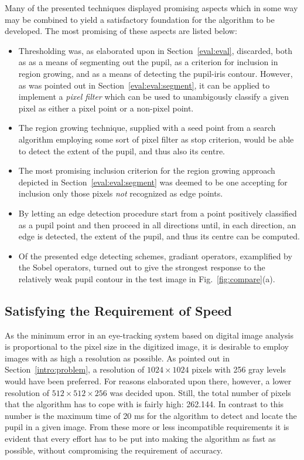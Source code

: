 Many of the presented techniques displayed promising aspects which in
some way may be combined to yield a satisfactory foundation for the
algorithm to be developed.  The most promising of these aspects are
listed below:

\begin{itemize}
\item Thresholding was, as elaborated upon in
  Section~\ref{eval:eval}, discarded, both as as a means of
  segmenting out the pupil, as a criterion for inclusion in region
  growing, and as a means of detecting the pupil-iris contour.
  However, as was pointed out in Section~\ref{eval:eval:segment}, it
  can be applied to implement a {\em pixel filter\/} which can be used
  to unambigously classify a given pixel as either a pixel point or a
  non-pixel point.
\item The region growing technique, supplied with a seed point from a
  search algorithm employing some sort of pixel filter as stop
  criterion, would be able to detect the extent of the pupil, and thus
  also its centre.
\item The most promising inclusion criterion for the region growing
  approach depicted in Section~\ref{eval:eval:segment} was deemed to
  be one accepting for inclusion only those pixels {\em not\/}
  recognized as edge points.
\item By letting an edge detection procedure start from a point
  positively classified as a pupil point and then proceed in
  all directions until, in each direction, an edge is detected, the
  extent of the pupil, and thus its centre can be computed.
\item Of the presented edge detecting schemes, gradiant operators,
  examplified by the Sobel operators, turned out to give the strongest
  response to the relatively weak pupil contour in the test image in
  Fig.~\ref{fig:compare}(a).
\end{itemize}

\subsection{Satisfying the Requirement of Speed}
\label{eval:approach:speed}

As the minimum error in an eye-tracking system based on digital image
analysis is proportional to the pixel size in the digitized image, it
is desirable to employ images with as high a resolution as possible.
As pointed out in Section~\ref{intro:problem}, a resolution of
$1024\times 1024$ pixels with 256 gray levels would have been
preferred.  For reasons elaborated upon there, however, a lower
resolution of $512\times 512\times 256$ was decided upon.  Still, the
total number of pixels that the algorithm has to cope with is fairly
high: 262.144.  In contrast to this number is the maximum time of 20
ms for the algorithm to detect and locate the pupil in a given image.
From these more or less incompatible requirements it is evident that
every effort has to be put into making the algorithm as fast as
possible, without compromising the requirement of accuracy.

